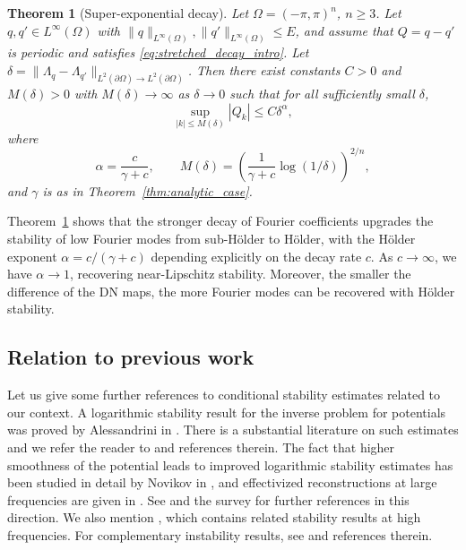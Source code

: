 \documentclass[a4paper, 11pt, twoside, notitlepage]{amsart}
\newtheorem{theorem}{Theorem}[section]
\theoremstyle{definition}
\theoremstyle{remark}
\begin{document}
\begin{theorem}[Super-exponential decay]\label{thm:stretched_exponential}
Let $\Omega = (-\pi,\pi)^n$, $n \geq 3$. Let $q, q' \in L^{\infty}(\Omega)$ with $\|q\|_{L^{\infty}(\Omega)}, \|q'\|_{L^{\infty}(\Omega)} \leq E$, and assume that $Q = q - q'$ is periodic and satisfies \eqref{eq:stretched_decay_intro}. Let $\delta = \|\Lambda_q - \Lambda_{q'}\|_{L^2(\partial\Omega) \to L^2(\partial\Omega)}$. Then there exist constants $C > 0$ and $M(\delta) > 0$ with $M(\delta) \to \infty$ as $\delta \to 0$ such that for all sufficiently small $\delta$,
\[
\sup_{|k| \leq M(\delta)} |Q_k| \leq C \delta^\alpha,
\]
where
\[
\alpha = \frac{c}{\gamma + c}, \qquad M(\delta) = \left( \frac{1}{\gamma + c} \log(1/\delta) \right)^{2/n},
\]
and $\gamma$ is as in Theorem~\ref{thm:analytic_case}.
\end{theorem}

Theorem~\ref{thm:stretched_exponential} shows that the stronger decay of Fourier coefficients upgrades the stability of low Fourier modes from sub-Hölder to Hölder, with the Hölder exponent $\alpha = c/(\gamma + c)$ depending explicitly on the decay rate $c$. As $c \to \infty$, we have $\alpha \to 1$, recovering near-Lipschitz stability. Moreover, the smaller the difference of the DN maps, the more Fourier modes can be recovered with Hölder stability.



\subsection{Relation to previous work}

Let us give some further references to conditional stability estimates related to our context. A logarithmic stability result for the inverse problem for potentials was proved by Alessandrini in \cite{alessandriniStableDeterminationConductivity1988}. There is a substantial literature on such estimates and we refer the reader to \cite{feldman_calderproblem_nodate} and references therein. The fact that higher smoothness of the potential leads to improved logarithmic stability estimates has been studied in detail by Novikov in \cite{Novikov2011}, and effectivized reconstructions at large frequencies are given in \cite{Novikov2009}. See \cite{IsaevNovikov2012, IsaevNovikov2014} and the survey \cite{Novikov2022} for further references in this direction. We also mention \cite{ammari_stability_2013}, which contains related stability results at high frequencies. For complementary instability results, see  \cite{mandache_exponential_2001, koch_instability_2021} and references therein. 
\end{document}
